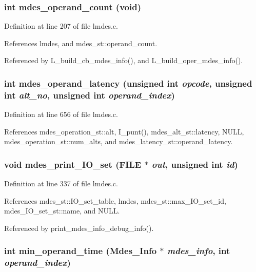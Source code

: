 \subsubsection{\setlength{\rightskip}{0pt plus 5cm}int mdes\_\-operand\_\-count (void)}\label{lmdes_8h_89ed8771e0c0f175530396acc020c4fe}




Definition at line 207 of file lmdes.c.

References lmdes, and mdes\_\-st::operand\_\-count.

Referenced by L\_\-build\_\-cb\_\-mdes\_\-info(), and L\_\-build\_\-oper\_\-mdes\_\-info().
\subsubsection{\setlength{\rightskip}{0pt plus 5cm}int mdes\_\-operand\_\-latency (unsigned int {\em opcode}, unsigned int {\em alt\_\-no}, unsigned int {\em operand\_\-index})}\label{lmdes_8h_8d6617c093d8f85c8fd4a7f493b2341e}




Definition at line 656 of file lmdes.c.

References mdes\_\-operation\_\-st::alt, I\_\-punt(), mdes\_\-alt\_\-st::latency, NULL, mdes\_\-operation\_\-st::num\_\-alts, and mdes\_\-latency\_\-st::operand\_\-latency.
\subsubsection{\setlength{\rightskip}{0pt plus 5cm}void mdes\_\-print\_\-IO\_\-set (FILE $\ast$ {\em out}, unsigned int {\em id})}\label{lmdes_8h_443caf6000199806854433e428d252b5}




Definition at line 337 of file lmdes.c.

References mdes\_\-st::IO\_\-set\_\-table, lmdes, mdes\_\-st::max\_\-IO\_\-set\_\-id, mdes\_\-IO\_\-set\_\-st::name, and NULL.

Referenced by print\_\-mdes\_\-info\_\-debug\_\-info().
\subsubsection{\setlength{\rightskip}{0pt plus 5cm}int min\_\-operand\_\-time (\bf{Mdes\_\-Info} $\ast$ {\em mdes\_\-info}, int {\em operand\_\-index})}\label{lmdes_8h_4b89be1b05bc574c5cc042cdeb8bb750}




